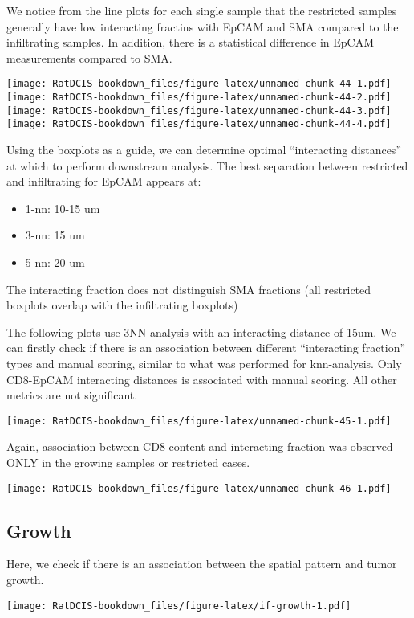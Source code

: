 \documentclass[
]{book}
\providecommand{\tightlist}{%
  \setlength{\itemsep}{0pt}\setlength{\parskip}{0pt}}
\begin{document}
We notice from the line plots for each single sample that the restricted samples generally have low interacting fractins with EpCAM and SMA compared to the infiltrating samples. In addition, there is a statistical difference in EpCAM measurements compared to SMA.

\texttt{[image: RatDCIS-bookdown\_files/figure-latex/unnamed-chunk-44-1.pdf]} \texttt{[image: RatDCIS-bookdown\_files/figure-latex/unnamed-chunk-44-2.pdf]} \texttt{[image: RatDCIS-bookdown\_files/figure-latex/unnamed-chunk-44-3.pdf]} \texttt{[image: RatDCIS-bookdown\_files/figure-latex/unnamed-chunk-44-4.pdf]}

Using the boxplots as a guide, we can determine optimal ``interacting distances'' at which to perform downstream analysis. The best separation between restricted and infiltrating for EpCAM appears at:

\begin{itemize}
\tightlist
\item
  1-nn: 10-15 um
\item
  3-nn: 15 um
\item
  5-nn: 20 um
\end{itemize}

The interacting fraction does not distinguish SMA fractions (all restricted boxplots overlap with the infiltrating boxplots)

The following plots use 3NN analysis with an interacting distance of 15um. We can firstly check if there is an association between different ``interacting fraction'' types and manual scoring, similar to what was performed for knn-analysis. Only CD8-EpCAM interacting distances is associated with manual scoring. All other metrics are not significant.

\texttt{[image: RatDCIS-bookdown\_files/figure-latex/unnamed-chunk-45-1.pdf]}

Again, association between CD8 content and interacting fraction was observed ONLY in the growing samples or restricted cases.

\texttt{[image: RatDCIS-bookdown\_files/figure-latex/unnamed-chunk-46-1.pdf]}

\hypertarget{growth-1}{%
\subsection{Growth}\label{growth-1}}

Here, we check if there is an association between the spatial pattern and tumor growth.

\texttt{[image: RatDCIS-bookdown\_files/figure-latex/if-growth-1.pdf]}
\end{document}
